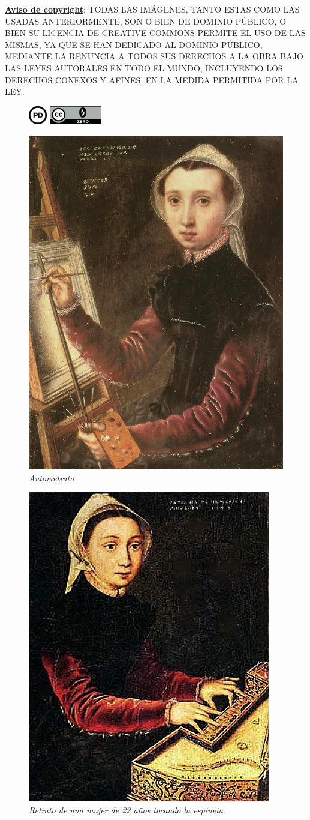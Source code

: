 \documentclass[12pt]{book}
\begin{document}
\underline{\textbf{Aviso de copyright}}: TODAS LAS IMÁGENES, TANTO ESTAS COMO LAS USADAS ANTERIORMENTE, SON O BIEN DE DOMINIO PÚBLICO, O BIEN SU LICENCIA DE CREATIVE COMMONS PERMITE EL USO DE LAS MISMAS, YA QUE SE HAN DEDICADO AL DOMINIO PÚBLICO, MEDIANTE LA RENUNCIA A TODOS SUS DERECHOS A LA OBRA BAJO LAS LEYES AUTORALES EN TODO EL MUNDO, INCLUYENDO LOS DERECHOS CONEXOS Y AFINES, EN LA MEDIDA PERMITIDA POR LA LEY.
\begin{figure}[h]
	\centering
	\begin{minipage}{.5\textwidth}
		\centering
		\includegraphics[height=0.8cm]{public-domain}
	\end{minipage}%
	\begin{minipage}{.5\textwidth}
		\centering
		\includegraphics[height=0.8cm]{cc0}
	\end{minipage}
\end{figure}

\begin{figure}[h]
	\centering
	\includegraphics[width=0.3\linewidth]{self-portrait}
	\caption{\textit{Autorretrato}}
	\label{fig:wrapfig}
\end{figure}

\begin{figure}[h]
	\centering
	\includegraphics[width=0.4\linewidth]{portrait-of-a-22-year-old-woman-playing-the-spinet}
	\caption{\textit{Retrato de una mujer de 22 años tocando la espineta}}
\end{figure}
\end{document}
